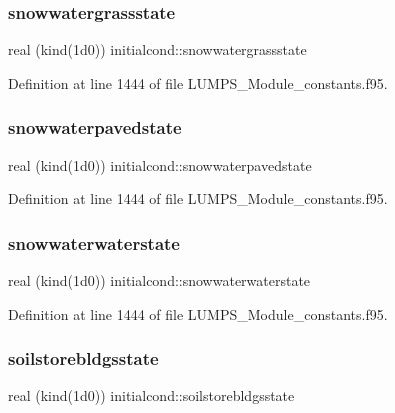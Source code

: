 \subsubsection{\texorpdfstring{snowwatergrassstate}{snowwatergrassstate}}
{\footnotesize\ttfamily real (kind(1d0)) initialcond\+::snowwatergrassstate}



Definition at line 1444 of file L\+U\+M\+P\+S\+\_\+\+Module\+\_\+constants.\+f95.

\mbox{\label{namespaceinitialcond_af36f3c934c44327d689b18eb9026b813}} 
\subsubsection{\texorpdfstring{snowwaterpavedstate}{snowwaterpavedstate}}
{\footnotesize\ttfamily real (kind(1d0)) initialcond\+::snowwaterpavedstate}



Definition at line 1444 of file L\+U\+M\+P\+S\+\_\+\+Module\+\_\+constants.\+f95.

\mbox{\label{namespaceinitialcond_a665ef7ff3d3626422d630673de6c82cb}} 
\subsubsection{\texorpdfstring{snowwaterwaterstate}{snowwaterwaterstate}}
{\footnotesize\ttfamily real (kind(1d0)) initialcond\+::snowwaterwaterstate}



Definition at line 1444 of file L\+U\+M\+P\+S\+\_\+\+Module\+\_\+constants.\+f95.

\mbox{\label{namespaceinitialcond_af657c0f9875b9819e2d30a94b1fa4775}} 
\subsubsection{\texorpdfstring{soilstorebldgsstate}{soilstorebldgsstate}}
{\footnotesize\ttfamily real (kind(1d0)) initialcond\+::soilstorebldgsstate}



